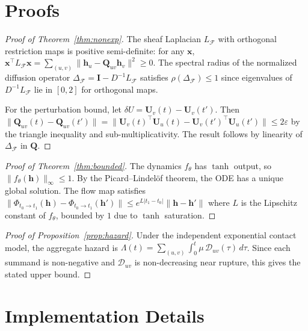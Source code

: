 \documentclass{article}
\begin{document}
\section{Proofs}
\label{app:proofs}

\begin{proof}[Proof of Theorem~\ref{thm:nonexp}]
The sheaf Laplacian $L_\mathcal{F}$ with orthogonal restriction maps
is positive semi-definite: for any $\mathbf{x}$,
$\mathbf{x}^\top L_\mathcal{F} \mathbf{x}
= \sum_{(u,v)} \|\mathbf{h}_u - \mathbf{Q}_{uv}\mathbf{h}_v\|^2 \ge 0$.
The spectral radius of the normalized diffusion operator
$\Delta_\mathcal{F} = \mathbf{I} - D^{-1}L_\mathcal{F}$ satisfies
$\rho(\Delta_\mathcal{F}) \le 1$ since eigenvalues of
$D^{-1}L_\mathcal{F}$ lie in $[0, 2]$ for orthogonal maps.

For the perturbation bound, let
$\delta U = \mathbf{U}_v(t) - \mathbf{U}_v(t')$.  Then
$\|\mathbf{Q}_{uv}(t) - \mathbf{Q}_{uv}(t')\|
= \|\mathbf{U}_v(t)^\top\mathbf{U}_u(t) - \mathbf{U}_v(t')^\top\mathbf{U}_u(t')\|
\le 2\varepsilon$ by the triangle inequality and sub-multiplicativity.
The result follows by linearity of $\Delta_\mathcal{F}$ in $\mathbf{Q}$.
\end{proof}

\begin{proof}[Proof of Theorem~\ref{thm:bounded}]
The dynamics $f_\theta$ has $\tanh$ output, so
$\|f_\theta(\mathbf{h})\|_\infty \le 1$.  By the Picard--Lindel\"of
theorem, the ODE has a unique global solution.  The flow map satisfies
$\|\Phi_{t_0 \to t_1}(\mathbf{h}) - \Phi_{t_0 \to t_1}(\mathbf{h}')\|
\le e^{L|t_1-t_0|}\|\mathbf{h} - \mathbf{h}'\|$ where $L$ is the
Lipschitz constant of $f_\theta$, bounded by $1$ due to $\tanh$
saturation.
\end{proof}

\begin{proof}[Proof of Proposition~\ref{prop:hazard}]
Under the independent exponential contact model, the aggregate hazard
is $\Lambda(t) = \sum_{(u,v)} \int_0^t \mu\,\mathcal{D}_{uv}(\tau)
\,d\tau$.  Since each summand is non-negative and $\mathcal{D}_{uv}$
is non-decreasing near rupture, this gives the stated upper bound.
\end{proof}

\section{Implementation Details}
\label{app:implementation}
\end{document}
